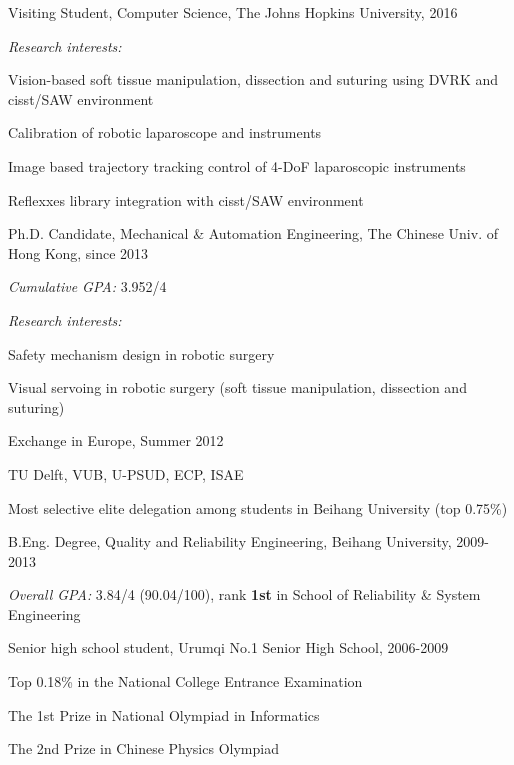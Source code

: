 \documentclass[10pt,letterpaper]{article}
\renewenvironment{itemize}{
  \begin{list}{}{
    \setlength{\leftmargin}{1.5em}
    \setlength{\itemsep}{0.25em}
    \setlength{\parskip}{0pt}
    \setlength{\parsep}{0.25em}
  }
}{
  \end{list}
}
\begin{document}
\begin{itemize}
  \item Visiting Student, Computer Science, The Johns Hopkins University, 2016
    \begin{itemize}
    \item \emph{Research interests:}
      \begin{itemize}
      \item Vision-based soft tissue manipulation, dissection and suturing using DVRK and cisst/SAW environment
      \item Calibration of robotic laparoscope and instruments
      \item Image based trajectory tracking control of 4-DoF laparoscopic instruments
      \item Reflexxes library integration with cisst/SAW environment
      \end{itemize}
    \end{itemize}
  \item Ph.D. Candidate, Mechanical \& Automation Engineering, The Chinese Univ. of Hong Kong, since 2013
    \begin{itemize}
    \item \emph{Cumulative GPA:} 3.952/4
    \item \emph{Research interests:}
      \begin{itemize}
      \item Safety mechanism design in robotic surgery
      \item Visual servoing in robotic surgery (soft tissue manipulation, dissection and suturing)
      \end{itemize}
    \end{itemize}
  \item Exchange in Europe, Summer 2012
    \begin{itemize}
    \item TU Delft, VUB, U-PSUD, ECP, ISAE
    \item Most selective elite delegation among students in Beihang University (top 0.75\%)
    \end{itemize}
  \item B.Eng. Degree, Quality and Reliability Engineering, Beihang University, 2009-2013
    \begin{itemize}
    \item \emph{Overall GPA:} 3.84/4 (90.04/100), rank \textbf{1st} in School of Reliability \& System Engineering
    \end{itemize}
  \item Senior high school student, Urumqi No.1 Senior High School, 2006-2009
    \begin{itemize}
    \item Top 0.18\% in the National College Entrance Examination
    \item The 1st Prize in National Olympiad in Informatics
    \item The 2nd Prize in Chinese Physics Olympiad
    \end{itemize}
\end{itemize}
\end{document}
